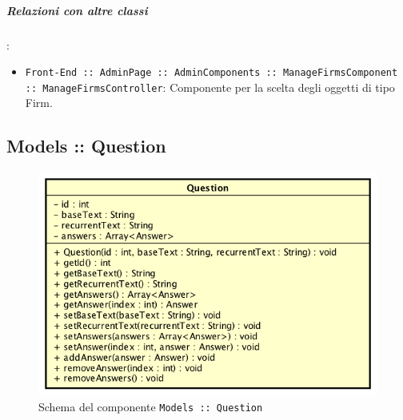 \documentclass[../ManualeSviluppatore_v1.0.0.tex]{subfiles}
\begin{document}
		\subparagraph{Relazioni con altre classi}:
		      \begin{itemize}
		      	\item \texttt{Front-End :: AdminPage :: AdminComponents :: ManageFirmsComponent :: ManageFirmsController}: Componente per la scelta degli oggetti di tipo Firm.
		      \end{itemize}

	\newpage
	\subsection{Models :: Question}
	\begin{figure}[!h]
		\centering
		\includegraphics[scale=0.6]{Architettura/Front-End/Models/Question.png}
		\caption{Schema del componente \texttt{Models :: Question}}
	\end{figure}
\end{document}
